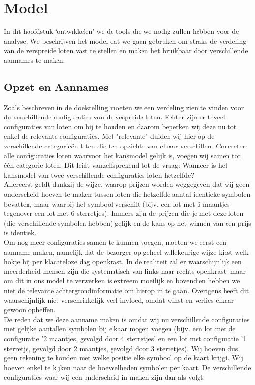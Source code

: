 \chapter{Model}\label{cha:model}

In dit hoofdstuk `ontwikkelen' we de tools die we nodig zullen hebben voor de analyse. We beschrijven het model dat we gaan gebruken om straks de verdeling van de verspreide loten vast te stellen en maken het bruikbaar door verschillende aannames te maken.
\section{Opzet en Aannames}

Zoals beschreven in de doelstelling moeten we een verdeling zien te vinden voor de verschillende configuraties van de vespreide loten. Echter zijn er teveel configuraties van loten om bij te houden en daarom beperken wij deze nu tot enkel de relevante configuraties. Met "relevante" duiden wij hier op de verschillende categorieën loten die ten opzichte van elkaar verschillen. Concreter: alle configuraties loten waarvoor het kansmodel gelijk is, voegen wij samen tot één categorie loten. Dit leidt vanzelfsprekend tot de vraag: Wanneer is het kansmodel van twee verschillende configuraties loten hetzelfde?\\

Allereerst geldt dankzij de wijze, waarop prijzen worden weggegeven dat wij geen onderscheid hoeven te maken tussen loten die hetzelfde aantal identieke symbolen bevatten, maar waarbij het symbool verschilt (bijv. een lot met 6 maantjes tegenover een lot met 6 sterretjes). Immers zijn de prijzen die je met deze loten (die verschillende symbolen hebben) gelijk en de kans op het winnen van een prijs is identiek.\\

Om nog meer configuraties samen te kunnen voegen, moeten we eerst een aanname maken, namelijk dat de bezorger op geheel willekeurige wijze kiest welk hokje hij per klachteloze dag openkrast. In de realiteit zal er waarschijnlijk een meerderheid mensen zijn die systematisch van links naar rechts openkrast, maar om dit in ons model te verwerken is extreem moeilijk en bovendien hebben we niet de relevante achtergrondinformatie om hierop in te gaan. Overigens heeft dit waarschijnlijk niet verschrikkelijk veel invloed, omdat winst en verlies elkaar gewoon opheffen.\\

De reden dat we deze aanname maken is omdat wij nu verschillende configuraties met gelijke aantallen symbolen bij elkaar mogen voegen (bijv. een lot met de configuratie '2 maantjes, gevolgd door 4 sterretjes' en een lot met configuratie '1 sterretje, gevolgd door 2 maantjes, gevolgd door 3 sterretjes). Wij hoeven dus geen rekening te houden met welke positie elke symbool op de kaart krijgt. Wij hoeven enkel te kijken naar de hoeveelheden symbolen per kaart. De verschillende configuraties waar wij een onderscheid in maken zijn dan als volgt:

